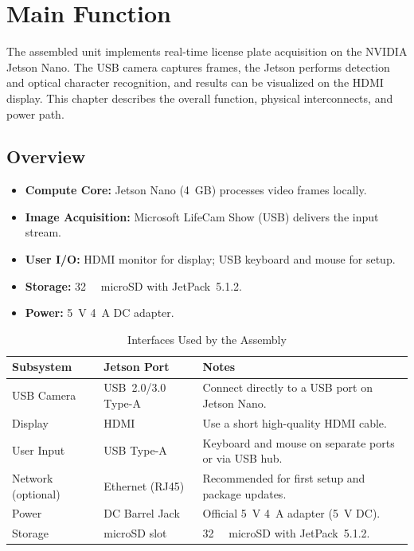 
\chapter{Main Function}

The assembled unit implements real-time license plate acquisition on the NVIDIA Jetson Nano.  
The USB camera captures frames, the Jetson performs detection and optical character recognition,  
and results can be visualized on the HDMI display. This chapter describes the overall function,  
physical interconnects, and power path.

\section*{Overview}
\begin{itemize}
	\item \textbf{Compute Core:} Jetson Nano (4~GB) processes video frames locally.
	\item \textbf{Image Acquisition:} Microsoft LifeCam Show (USB) delivers the input stream.
	\item \textbf{User I/O:} HDMI monitor for display; USB keyboard and mouse for setup.
	\item \textbf{Storage:} \SI{32}{\giga\byte} microSD with JetPack~5.1.2.
	\item \textbf{Power:} \SI{5}{\volt} \SI{4}{\ampere} DC adapter.
\end{itemize}

\begin{table}[H]
	\centering
	\caption{Interfaces Used by the Assembly}
	\begin{tabular}{|L{3.2cm}|L{4.2cm}|L{5.8cm}|}
		\hline
		\textbf{Subsystem} & \textbf{Jetson Port} & \textbf{Notes} \\ \hline
		USB Camera & USB~2.0/3.0 Type-A & Connect directly to a USB port on Jetson Nano. \\ \hline
		Display & HDMI & Use a short high-quality HDMI cable. \\ \hline
		User Input & USB Type-A & Keyboard and mouse on separate ports or via USB hub. \\ \hline
		Network (optional) & Ethernet (RJ45) & Recommended for first setup and package updates. \\ \hline
		Power & DC Barrel Jack & Official \SI{5}{\volt} \SI{4}{\ampere} adapter (5~V DC). \\ \hline
		Storage & microSD slot & \SI{32}{\giga\byte} microSD with JetPack~5.1.2. \\ \hline
	\end{tabular}
\end{table}

